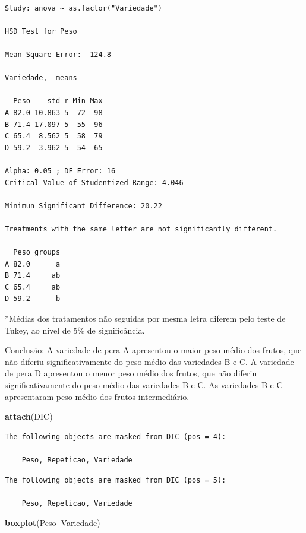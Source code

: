 \documentclass[12pt,brazil,oneside]{book}
\newenvironment{Shaded}{\begin{snugshade}}{\end{snugshade}}
\newcommand{\KeywordTok}[1]{\textcolor[rgb]{0.13,0.29,0.53}{\textbf{#1}}}
\newcommand{\NormalTok}[1]{#1}
\newcommand{\OperatorTok}[1]{\textcolor[rgb]{0.81,0.36,0.00}{\textbf{#1}}}
\begin{document}
\begin{verbatim}

Study: anova ~ as.factor("Variedade")

HSD Test for Peso 

Mean Square Error:  124.8 

Variedade,  means

  Peso    std r Min Max
A 82.0 10.863 5  72  98
B 71.4 17.097 5  55  96
C 65.4  8.562 5  58  79
D 59.2  3.962 5  54  65

Alpha: 0.05 ; DF Error: 16 
Critical Value of Studentized Range: 4.046 

Minimun Significant Difference: 20.22 

Treatments with the same letter are not significantly different.

  Peso groups
A 82.0      a
B 71.4     ab
C 65.4     ab
D 59.2      b
\end{verbatim}

*Médias dos tratamentos não seguidas por mesma letra diferem pelo teste
de Tukey, ao nível de 5\% de significância.

Conclusão: A variedade de pera A apresentou o maior peso médio dos
frutos, que não diferiu significativamente do peso médio das variedades
B e C. A variedade de pera D apresentou o menor peso médio dos frutos,
que não diferiu significativamente do peso médio das variedades B e C.
As variedades B e C apresentaram peso médio dos frutos intermediário.

\begin{Shaded}
\begin{Highlighting}[]
\KeywordTok{attach}\NormalTok{(DIC)}
\end{Highlighting}
\end{Shaded}

\begin{verbatim}
The following objects are masked from DIC (pos = 4):

    Peso, Repeticao, Variedade
\end{verbatim}

\begin{verbatim}
The following objects are masked from DIC (pos = 5):

    Peso, Repeticao, Variedade
\end{verbatim}

\begin{Shaded}
\begin{Highlighting}[]
\KeywordTok{boxplot}\NormalTok{(Peso}\OperatorTok{~}\NormalTok{Variedade)}
\end{Highlighting}
\end{Shaded}
\end{document}
